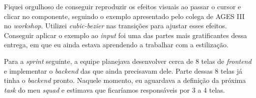 Fiquei orgulhoso de conseguir reproduzir os efeitos visuais ao passar o
cursor e clicar no componente, seguindo o exemplo apresentado pelo colega
de AGES III no \textit{workshop}. Utilizei \textit{cubic-bezier} nas
transições para ajustar esses efeitos. Conseguir aplicar o exemplo ao
\textit{input} foi uma das partes mais gratificantes dessa entrega, em que
eu ainda estava aprendendo a trabalhar com a estilização.


Para a \textit{sprint} seguinte, a equipe planejava desenvolver cerca de 8 telas
de \textit{frontend} e implementar o \textit{backend} das que ainda precisavam
dele. Parte dessas 8 telas já tinha o \textit{backend} pronto. Naquele momento,
eu aguardava a definição da próxima \textit{task} do meu \textit{squad} e estimava
que ficaríamos responsáveis por 3 a 4 telas.
